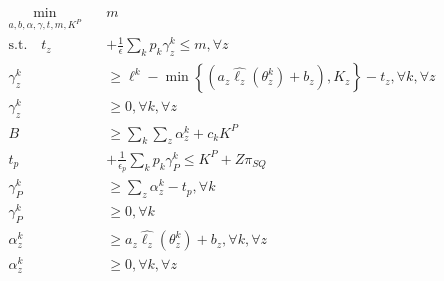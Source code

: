 \documentclass[11pt]{article}
\begin{document}
    \begin{align}
        \min_{a,b,\alpha,\gamma,t,m,K^P} \quad & m\\
        \text{s.t.} \quad t_z &+ \frac{1}{\epsilon} \sum_k p_k \gamma_z^k \leq m, \forall z\\
        \gamma_z^k &\geq \ell^k - \min\left\{(a_z\hat{\ell_z}(\theta_z^k) + b_z), K_z\right\} -t_z, \forall k, \forall z \\
        \gamma_z^k &\geq 0, \forall k, \forall z\\
        B &\geq \sum_k \sum_z \alpha^k_z + c_k K^P\\
        t_p &+ \frac{1}{\epsilon_p} \sum_k p_k \gamma_P^k \leq K^P+Z\pi_{SQ}\\
        \gamma_P^k &\geq \sum_z \alpha^k_z -t_p, \forall k \\
        \gamma_P^k &\geq 0, \forall k\\
        \alpha^k_z &\geq a_z \hat{\ell_z}(\theta^k_z) + b_z, \forall k, \forall z\\
        \alpha^k_z &\geq 0, \forall k, \forall z
    \end{align}






\end{document}

